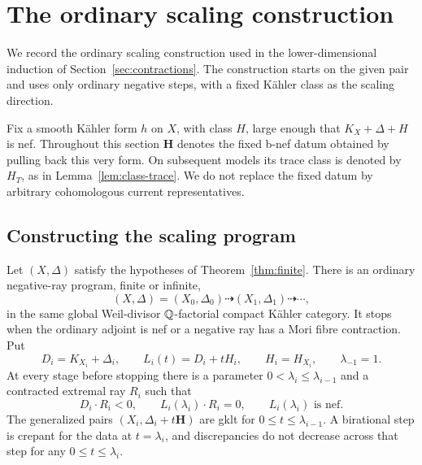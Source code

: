 \section{The ordinary scaling construction}\label{sec:scaling}

We record the ordinary scaling construction used in the
lower-dimensional induction of Section~\ref{sec:contractions}. The
construction starts on the given pair and uses only ordinary negative
steps, with a fixed Kähler class as the scaling direction.

Fix a smooth Kähler form \(h\) on \(X\), with class \(H\), large enough
that \(K_X+\Delta+H\) is nef.  Throughout this section
\(\mathbf H\) denotes the fixed b-nef datum obtained by pulling back
this very form.  On subsequent models its trace class is denoted by
\(H_T\), as in Lemma~\ref{lem:class-trace}.  We do not replace the
fixed datum by arbitrary cohomologous current representatives.

\subsection{Constructing the scaling program}

\begin{proposition}\label{prop:scaling-construction}
Let \((X,\Delta)\) satisfy the hypotheses of Theorem~\ref{thm:finite}.
There is an ordinary negative-ray program, finite or infinite,
\[
 (X,\Delta)=(X_0,\Delta_0)\dashrightarrow
 (X_1,\Delta_1)\dashrightarrow\cdots,
\]
in the same global Weil-divisor \(\mathbb Q\)-factorial compact Kähler
category.  It stops when the ordinary adjoint is nef or a negative ray
has a Mori fibre contraction.  Put
\[
 D_i=K_{X_i}+\Delta_i,\qquad
 L_i(t)=D_i+tH_i,\qquad H_i=H_{X_i},\qquad \lambda_{-1}=1.
\]
At every stage before stopping there is a parameter
\(0<\lambda_i\leq\lambda_{i-1}\) and a contracted extremal ray
\(R_i\) such that
\[
 D_i\cdot R_i<0,\qquad L_i(\lambda_i)\cdot R_i=0,
 \qquad L_i(\lambda_i)\text{ is nef}.
\]
The generalized pairs \((X_i,\Delta_i+t\mathbf H)\) are gklt for
\(0\leq t\leq\lambda_{i-1}\).  A birational step is crepant for the
data at \(t=\lambda_i\), and discrepancies do not decrease across
that step for any \(0\leq t\leq\lambda_i\).
\end{proposition}

